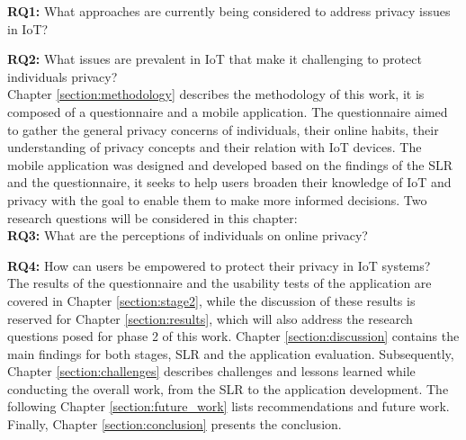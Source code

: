 
\textbf{RQ1:} What approaches are currently being considered to address privacy
issues in IoT?

\textbf{RQ2:} What issues are prevalent in IoT that make it challenging to
protect individuals privacy? \\

Chapter \ref{section:methodology} describes the methodology of this work, it is composed of a
questionnaire and a mobile application. The questionnaire aimed to gather
the general privacy concerns of individuals, their online habits, their
understanding of privacy concepts and their relation with IoT devices.
The mobile application was designed and developed based on the findings
of the SLR and the questionnaire, it seeks to help users broaden their
knowledge of IoT and privacy with the goal to enable them to make more
informed decisions. Two research questions will be considered in this
chapter:\\


\textbf{RQ3:} What are the perceptions of individuals on online privacy?

\textbf{RQ4:} How can users be empowered to protect their privacy in IoT systems?\\

The results of the questionnaire and the usability tests of the application are
covered in Chapter \ref{section:stage2}, while the discussion of these results is reserved for
Chapter \ref{section:results}, which will also address the research questions posed for phase 2 of
this work. Chapter \ref{section:discussion} contains the main findings for both stages, SLR and the
application evaluation. Subsequently, Chapter \ref{section:challenges} describes challenges and lessons
learned while conducting the overall work, from the SLR to the application
development. The following Chapter \ref{section:future_work} lists recommendations and future work.
Finally, Chapter \ref{section:conclusion} presents the conclusion.
